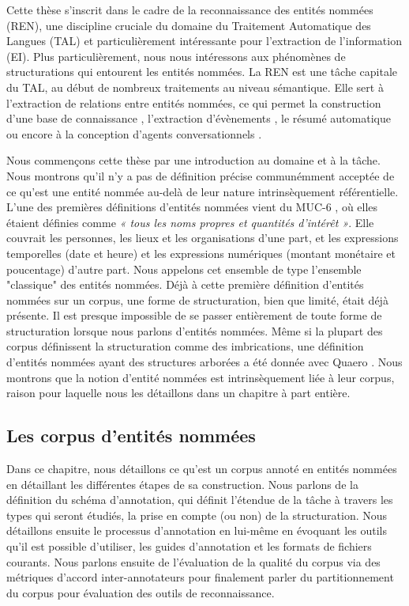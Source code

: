 \documentclass[PhD-Yoann-Dupont.tex]{subfiles}
\begin{document}
Cette thèse s'inscrit dans le cadre de la reconnaissance des entités nommées (REN), une discipline cruciale du domaine du Traitement Automatique des Langues (TAL) et particulièrement intéressante pour l'extraction de l'information (EI). Plus particulièrement, nous nous intéressons aux phénomènes de structurations qui entourent les entités nommées. La REN est une tâche capitale du TAL, au début de nombreux traitements au niveau sémantique. Elle sert à l'extraction de relations entre entités nommées, ce qui permet la construction d'une base de connaissance \citep{surdeanu2014overview,rahman2017tac}, l'extraction d'évènements \citep{kumaran2004text}, le résumé automatique \citep{nobata2002summarization,spitz2016terms} ou encore à la conception d'agents conversationnels \citep{cahn2017chatbot}.

%
%

Nous commençons cette thèse par une introduction au domaine et à la tâche. Nous montrons qu'il n'y a pas de définition précise communémment acceptée de ce qu'est une entité nommée au-delà de leur nature intrinsèquement référentielle. L'une des premières définitions d'entités nommées vient du MUC-6 \citep{grishman1996message}, où elles étaient définies comme \emph{« tous les noms propres et quantités d'intérêt »}. Elle couvrait les personnes, les lieux et les organisations d'une part, et les expressions temporelles (date et heure) et les expressions numériques (montant monétaire et poucentage) d'autre part. Nous appelons cet ensemble de type l'ensemble "classique" des entités nommées. Déjà à cette première définition d'entités nommées sur un corpus, une forme de structuration, bien que limité, était déjà présente. Il est presque impossible de se passer entièrement de toute forme de structuration lorsque nous parlons d'entités nommées. Même si la plupart des corpus définissent la structuration comme des imbrications, une définition d'entités nommées ayant des structures arborées a été donnée avec Quaero \citep{rosset2011entites}. Nous montrons que la notion d'entité nommées est intrinsèquement liée à leur corpus, raison pour laquelle nous les détaillons dans un chapitre à part entière.

\subsection*{Les corpus d'entités nommées}

Dans ce chapitre, nous détaillons ce qu'est un corpus annoté en entités nommées en détaillant les différentes étapes de sa construction. Nous parlons de la définition du schéma d'annotation, qui définit l'étendue de la tâche à travers les types qui seront étudiés, la prise en compte (ou non) de la structuration. Nous détaillons ensuite le processus d'annotation en lui-même en évoquant les outils qu'il est possible d'utiliser, les guides d'annotation et les formats de fichiers courants. Nous parlons ensuite de l'évaluation de la qualité du corpus via des métriques d'accord inter-annotateurs pour finalement parler du partitionnement du corpus pour évaluation des outils de reconnaissance.
\end{document}
